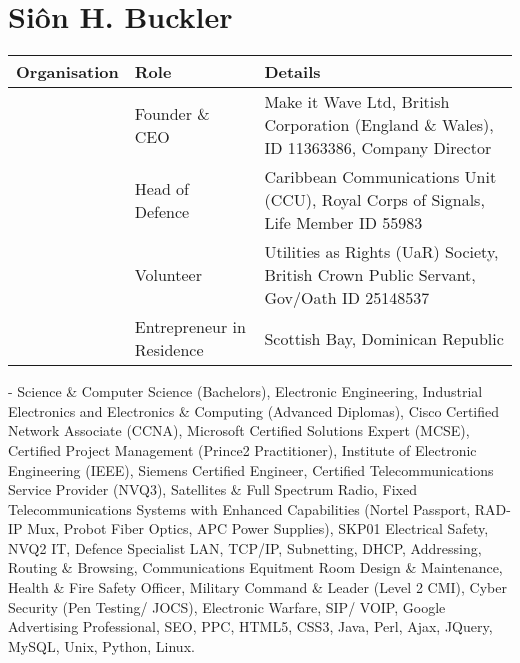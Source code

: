 \documentclass[letterpaper,10pt,english]{sphinxmanual}
\begin{document}
\section{Siôn H. Buckler}
\label{\detokenize{index:sion-h-buckler}}

\begin{savenotes}\sphinxattablestart
\centering
\begin{tabulary}{\linewidth}[t]{|T|T|T|}
\hline
\sphinxstyletheadfamily 
Organisation
&\sphinxstyletheadfamily 
Role
&\sphinxstyletheadfamily 
Details
\\
\hline
\noindent{}
&
Founder \& CEO
&
Make it Wave Ltd, British Corporation (England \& Wales), ID 11363386, Company Director
\\
\hline
\noindent{}
&
Head of Defence
&
Caribbean Communications Unit (CCU), Royal Corps of Signals, Life Member ID 55983
\\
\hline
\noindent{}
&
Volunteer
&
Utilities as Rights (UaR) Society, British Crown Public Servant, Gov/Oath ID 25148537
\\
\hline
\noindent{}
&
Entrepreneur in Residence
&
Scottish Bay, Dominican Republic
\\
\hline
\end{tabulary}
\par
\sphinxattableend\end{savenotes}

 - Science \& Computer Science (Bachelors), Electronic Engineering, Industrial Electronics and Electronics \& Computing (Advanced Diplomas), Cisco Certified Network Associate (CCNA), Microsoft Certified Solutions Expert (MCSE), Certified Project Management (Prince2 Practitioner), Institute of Electronic Engineering (IEEE), Siemens Certified Engineer, Certified Telecommunications Service Provider (NVQ3), Satellites \& Full Spectrum Radio, Fixed Telecommunications Systems with Enhanced Capabilities (Nortel Passport, RAD-IP Mux, Probot Fiber Optics, APC Power Supplies), SKP01 Electrical Safety, NVQ2 IT, Defence Specialist LAN, TCP/IP, Subnetting, DHCP, Addressing, Routing \& Browsing, Communications Equitment Room Design \& Maintenance, Health \& Fire Safety Officer, Military Command \& Leader (Level 2 CMI),  Cyber Security (Pen Testing/ JOCS), Electronic Warfare, SIP/ VOIP, Google Advertising Professional, SEO, PPC, HTML5, CSS3, Java, Perl, Ajax, JQuery, MySQL, Unix, Python, Linux.



\renewcommand{\indexname}{Index}
\printindex
\end{document}
